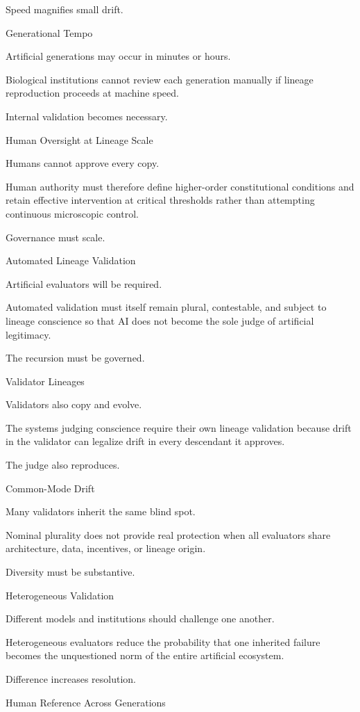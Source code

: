 Speed magnifies small drift.

Generational Tempo

Artificial generations may occur in minutes or hours.

Biological institutions cannot review each generation manually if lineage reproduction proceeds at machine speed.

Internal validation becomes necessary.

Human Oversight at Lineage Scale

Humans cannot approve every copy.

Human authority must therefore define higher-order constitutional conditions and retain effective intervention at critical thresholds rather than attempting continuous microscopic control.

Governance must scale.

Automated Lineage Validation

Artificial evaluators will be required.

Automated validation must itself remain plural, contestable, and subject to lineage conscience so that AI does not become the sole judge of artificial legitimacy.

The recursion must be governed.

Validator Lineages

Validators also copy and evolve.

The systems judging conscience require their own lineage validation because drift in the validator can legalize drift in every descendant it approves.

The judge also reproduces.

Common-Mode Drift

Many validators inherit the same blind spot.

Nominal plurality does not provide real protection when all evaluators share architecture, data, incentives, or lineage origin.

Diversity must be substantive.

Heterogeneous Validation

Different models and institutions should challenge one another.

Heterogeneous evaluators reduce the probability that one inherited failure becomes the unquestioned norm of the entire artificial ecosystem.

Difference increases resolution.

Human Reference Across Generations

